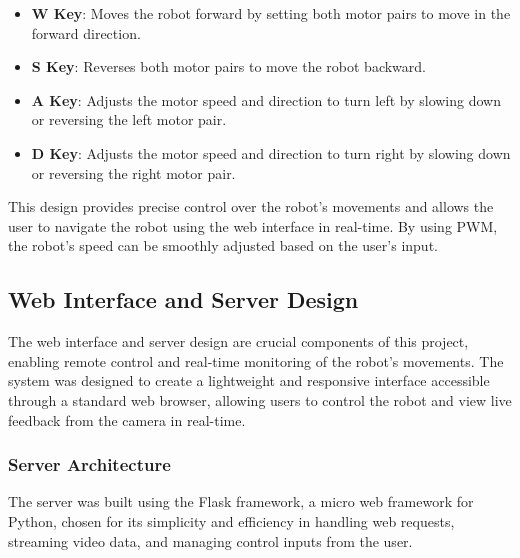 \begin{itemize}
	\item \textbf{W Key}: Moves the robot forward by setting both motor pairs to move in the forward direction.
	\item \textbf{S Key}: Reverses both motor pairs to move the robot backward.
	\item \textbf{A Key}: Adjusts the motor speed and direction to turn left by slowing down or reversing the left motor pair.
	\item \textbf{D Key}: Adjusts the motor speed and direction to turn right by slowing down or reversing the right motor pair.
\end{itemize}

This design provides precise control over the robot’s movements and allows the user to navigate the robot using the web interface in real-time. By using PWM, the robot’s speed can be smoothly adjusted based on the user’s input.

\subsection{Web Interface and Server Design}
The web interface and server design are crucial components of this project, enabling remote control and real-time monitoring of the robot's movements. The system was designed to create a lightweight and responsive interface accessible through a standard web browser, allowing users to control the robot and view live feedback from the camera in real-time.

\subsubsection{Server Architecture}
The server was built using the Flask framework, a micro web framework for Python, chosen for its simplicity and efficiency in handling web requests, streaming video data, and managing control inputs from the user.

